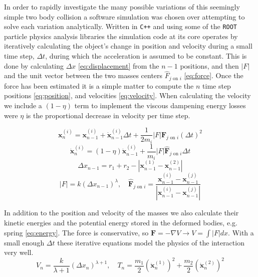\documentclass[aps,prl,floatfix,preprint,nofootinbib]{revtex4}
\begin{document}
In order to rapidly investigate the many possible variations of this seemingly simple two body collision a software simulation was chosen over attempting to solve each variation analytically. Written in \texttt{C++} and using some of the \texttt{ROOT}~\cite{ref_root} particle physics analysis libraries the simulation code at its core operates by iteratively calculating the object's change in position and velocity during a small time step, $\Delta t$, during which the acceleration is assumed to be constant. This is done by calculating $\Delta x$ \eqref{eq:displacement} from the $n-1$ positions, and then $\left|F\right|$ and the unit vector between the two masses centers $\hat{F}_{j\text{ on }i}$ \eqref{eq:force}. Once the force has been estimated it is a simple matter to compute the $n$ time step positions \eqref{eq:position}, and velocities \eqref{eq:velocity}. When calculating the velocity we include a $\left(1-\eta\right)$ term to implement the viscous dampening energy losses were $\eta$ is the proportional decrease in velocity per time step.

\begin{equation}\label{eq:position}
\mathbf{x}^{(i)}_{n} = \mathbf{x}^{(i)}_{n-1} + \dot{\mathbf{x}}^{(i)}_{n-1} \Delta t + \frac{1}{2m_i} \left| F \right| \mathbf{\hat{F}}_{j\text{ on }i} \left(\Delta t\right)^2
\end{equation}
\begin{equation}\label{eq:velocity}
\dot{\mathbf{x}}^{(i)}_{n} = (1-\eta)\dot{\mathbf{x}}^{(i)}_{n-1} + \frac{1}{m_i} \left| F \right| \mathbf{\hat{F}}_{j\text{ on }i} \Delta t
\end{equation}
\begin{equation}\label{eq:displacement}
\Delta x_{n-1} = r_1 + r_2 - \left| \mathbf{x}^{(1)}_{n-1}-\mathbf{x}^{(2)}_{n-1} \right|
\end{equation}
\begin{equation}\label{eq:force}
\left| F \right| = k \left(\Delta x_{n-1}\right)^{\lambda},\quad \mathbf{\hat{F}}_{j\text{ on }i} = \frac{\mathbf{x}^{(i)}_{n-1}-\mathbf{x}^{(j)}_{n-1}}{\left|\mathbf{x}^{(i)}_{n-1}-\mathbf{x}^{(j)}_{n-1}\right|}
\end{equation}

In addition to the position and velocity of the masses we also calculate their kinetic energies and the potential energy stored in the deformed bodies, e.g. spring \eqref{eq:energy}. The force is conservative, so $\mathbf{F} = - \nabla V \rightarrow V = \int \left|F\right| dx$. With a small enough $\Delta t$ these iterative equations model the physics of the interaction very well. 
\begin{equation}\label{eq:energy}
V_n = \frac{k}{\lambda+1}\left(\Delta x_n\right)^{\lambda+1},\quad T_n = \frac{m_1}{2}\left(\dot{\mathbf{x}}^{(1)}_n\right)^2 + \frac{m_2}{2}\left(\dot{\mathbf{x}}^{(2)}_n\right)^2
\end{equation}
\end{document}
